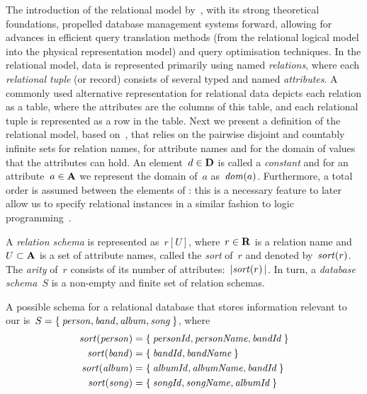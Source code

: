 The introduction of the relational model by~\citet{Codd:1970aa}, with its strong theoretical foundations, propelled
database management systems forward, allowing for advances in efficient query translation methods (from the relational
logical model into the physical representation model) and query optimisation techniques.
%
In the relational model, data is represented primarily using named \emph{relations}, where each \emph{relational tuple}
(or record) consists of several typed and named \emph{attributes}.  A commonly used alternative representation for
relational data depicts each relation as a table, where the attributes are the columns of this table, and each
relational tuple is represented as a row in the table.
%
Next we present a definition of the relational model, based on~\citet{AbiteboulHullVianu:1995aa}, that relies on the
pairwise disjoint and countably infinite sets \AR for relation names, \AAs for attribute names and \AD for the domain of
values that the attributes can hold.
%
An element~$d \in \mathbf{D}$ is called a \emph{constant} and for an attribute~$a \in \mathbf{A}$ we represent the domain of~$a$
as~$\mathit{dom}\!\left(a\right)$.
%
Furthermore, a total order is assumed between the elements of \AAs: this is a necessary feature to later allow us to
specify relational instances in a similar fashion to logic programming~\cite{Lloyd:1987aa}.
%
\begin{definition}
  \label{def:database-schema}
  A \emph{relation schema} is represented as~$r[U]$, where~$r \in \mathbf{R}$ is a relation name and~$U \subset \mathbf{A}$ is a set
  of attribute names, called the \emph{sort} of~$r$ and denoted by~$\mathit{sort}\!\left(r\right)$.  The \emph{arity} of~$r$
  consists of its number of attributes:~$|\mathit{sort}\!\left(r\right)|$.
  In turn, a \emph{database schema}~$S$ is a non-empty and finite set of relation schemas.
\end{definition}



\begin{example}
  \label{ex:bands-schema}
  A possible schema for a relational database that stores information relevant to our \usecase
  is~$S = \left\{\:\mathit{person}, \mathit{band}, \mathit{album}, \mathit{song}\:\right\}$, where
  \begin{align*}
    \funcCall{sort}{\relationName{person}} &= \set{\mathit{personId}, \mathit{personName}, \mathit{bandId}}\\
    \funcCall{sort}{\relationName{band}} &= \set{\mathit{bandId}, \mathit{bandName}}\\
    \funcCall{sort}{\relationName{album}} &= \set{\mathit{albumId}, \mathit{albumName}, \mathit{bandId}}\\
    \funcCall{sort}{\relationName{song}} &= \set{\mathit{songId}, \mathit{songName}, \mathit{albumId}}%
  \end{align*}%
\end{example}



